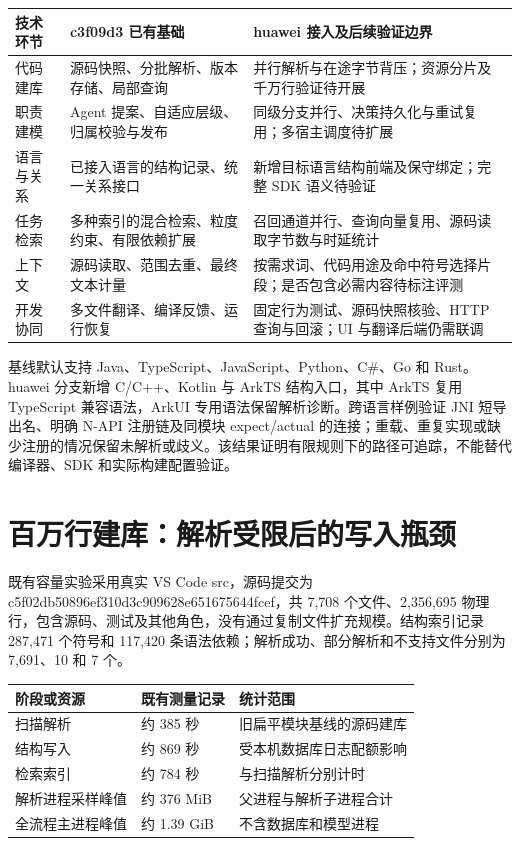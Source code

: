 \begin{center}\small
\begin{longtable}{P{0.19\textwidth}P{0.33\textwidth}P{0.38\textwidth}}
\toprule
技术环节 & c3f09d3 已有基础 & huawei 接入及后续验证边界 \\
\midrule\endhead
代码建库 & 源码快照、分批解析、版本存储、局部查询 & 并行解析与在途字节背压；资源分片及千万行验证待开展 \\
职责建模 & Agent 提案、自适应层级、归属校验与发布 & 同级分支并行、决策持久化与重试复用；多宿主调度待扩展 \\
语言与关系 & 已接入语言的结构记录、统一关系接口 & 新增目标语言结构前端及保守绑定；完整 SDK 语义待验证 \\
任务检索 & 多种索引的混合检索、粒度约束、有限依赖扩展 & 召回通道并行、查询向量复用、源码读取字节数与时延统计 \\
上下文 & 源码读取、范围去重、最终文本计量 & 按需求词、代码用途及命中符号选择片段；是否包含必需内容待标注评测 \\
开发协同 & 多文件翻译、编译反馈、运行恢复 & 固定行为测试、源码快照核验、HTTP 查询与回滚；UI 与翻译后端仍需联调 \\
\bottomrule
\end{longtable}\end{center}

基线默认支持 Java、TypeScript、JavaScript、Python、C\#、Go 和 Rust。huawei 分支新增 C/C++、Kotlin 与 ArkTS 结构入口，其中 ArkTS 复用 TypeScript 兼容语法，ArkUI 专用语法保留解析诊断。跨语言样例验证 JNI 短导出名、明确 N-API 注册链及同模块 expect/actual 的连接；重载、重复实现或缺少注册的情况保留未解析或歧义。该结果证明有限规则下的路径可追踪，不能替代编译器、SDK 和实际构建配置验证。

\section{百万行建库：解析受限后的写入瓶颈}

既有容量实验采用真实 VS Code src，源码提交为 c5f02db50896ef310d3c909628e651675644fcef，共 7,708 个文件、2,356,695 物理行，包含源码、测试及其他角色，没有通过复制文件扩充规模。结构索引记录 287,471 个符号和 117,420 条语法依赖；解析成功、部分解析和不支持文件分别为 7,691、10 和 7 个。

\begin{center}\small
\begin{longtable}{P{0.19\textwidth}P{0.33\textwidth}P{0.38\textwidth}}
\toprule
阶段或资源 & 既有测量记录 & 统计范围 \\
\midrule\endhead
扫描解析 & 约 385 秒 & 旧扁平模块基线的源码建库 \\
结构写入 & 约 869 秒 & 受本机数据库日志配额影响 \\
检索索引 & 约 784 秒 & 与扫描解析分别计时 \\
解析进程采样峰值 & 约 376 MiB & 父进程与解析子进程合计 \\
全流程主进程峰值 & 约 1.39 GiB & 不含数据库和模型进程 \\
\bottomrule
\end{longtable}\end{center}

